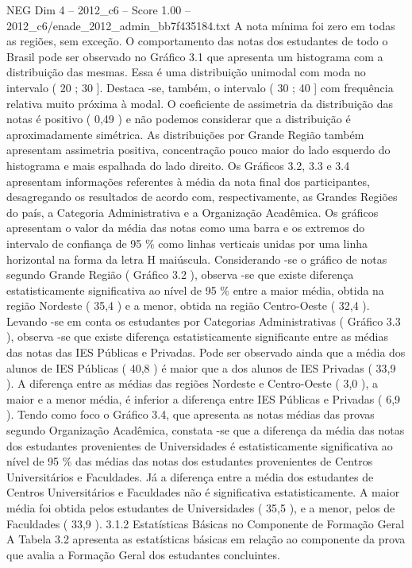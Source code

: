 \begin{textsample}{NEG Dim 4 – 2012\_c6 – Score 1.00 – 2012\_c6/enade\_2012\_admin\_bb7f435184.txt}
A nota mínima foi zero em todas as regiões, sem exceção.
O comportamento das notas dos estudantes de todo o Brasil pode ser observado no Gráfico 3.1 que apresenta um histograma com a distribuição das mesmas.
Essa é uma distribuição unimodal com moda no intervalo ( 20 ; 30 ].
Destaca -se, também, o intervalo ( 30 ; 40 ] com frequência relativa muito próxima à modal.
O coeficiente de assimetria da distribuição das notas é positivo ( 0,49 ) e não podemos considerar que a distribuição é aproximadamente simétrica.
As distribuições por Grande Região também apresentam assimetria positiva, concentração pouco maior do lado esquerdo do histograma e mais espalhada do lado direito.
Os Gráficos 3.2, 3.3 e 3.4 apresentam informações referentes à média da nota final dos participantes, desagregando os resultados de acordo com, respectivamente, as Grandes Regiões do país, a Categoria Administrativa e a Organização Acadêmica.
Os gráficos apresentam o valor da média das notas como uma barra e os extremos do intervalo de confiança de 95 \% como linhas verticais unidas por uma linha horizontal na forma da letra H maiúscula.
Considerando -se o gráfico de notas segundo Grande Região ( Gráfico 3.2 ), observa -se que existe diferença estatisticamente significativa ao nível de 95 \% entre a maior média, obtida na região Nordeste ( 35,4 ) e a menor, obtida na região Centro-Oeste ( 32,4 ).
Levando -se em conta os estudantes por Categorias Administrativas ( Gráfico 3.3 ), observa -se que existe diferença estatisticamente significante entre as médias das notas das IES Públicas e Privadas.
Pode ser observado ainda que a média dos alunos de IES Públicas ( 40,8 ) é maior que a dos alunos de IES Privadas ( 33,9 ).
A diferença entre as médias das regiões Nordeste e Centro-Oeste ( 3,0 ), a maior e a menor média, é inferior a diferença entre IES Públicas e Privadas ( 6,9 ).
Tendo como foco o Gráfico 3.4, que apresenta as notas médias das provas segundo Organização Acadêmica, constata -se que a diferença da média das notas dos estudantes provenientes de Universidades é estatisticamente significativa ao nível de 95 \% das médias das notas dos estudantes provenientes de Centros Universitários e Faculdades.
Já a diferença entre a média dos estudantes de Centros Universitários e Faculdades não é significativa estatisticamente.
A maior média foi obtida pelos estudantes de Universidades ( 35,5 ), e a menor, pelos de Faculdades ( 33,9 ). 3.1.2 Estatísticas Básicas no Componente de Formação Geral A Tabela 3.2 apresenta as estatísticas básicas em relação ao componente da prova que avalia a Formação Geral dos estudantes concluintes.

\end{textsample}
